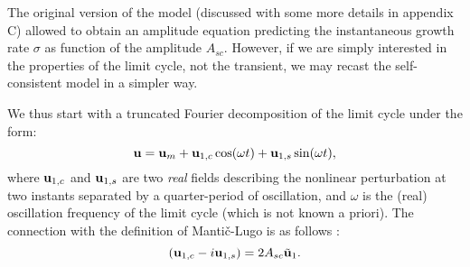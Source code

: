 \documentclass[twocolumn,10pt]{asme2ej}
\newcommand{\be}[1]{ \begin{equation} \label{#1}}
\newcommand{\ee}{\end{equation}}
\begin{document}
The original version of the model (discussed with some more details in appendix C) allowed to obtain an amplitude equation predicting the instantaneous growth rate $\sigma$ as function of the amplitude $A_{sc}$. However, if we are simply interested in the properties of the limit cycle, not the transient, we may recast the self-consistent model in a simpler way. 







We thus start with a truncated Fourier decomposition of the limit cycle under the form:
\be{HB}
{\bf u } = {\bf u }_m + {\bf u }_{1,c} \cos( \omega t ) +   {\bf u }_{1,s} \sin( \omega t ),
\ee
where ${\bf u }_{1,c}$ and ${\bf u }_{1,s}$ are two {\em real} fields describing the nonlinear perturbation at two instants separated by a quarter-period of oscillation, and $\omega$ is the (real) oscillation frequency of the limit cycle (which is not known a priori).  
The connection with the definition of Manti\v{c}-Lugo is as follows :
\be{HBtoSC}
\left( {\bf u }_{1,c} - i {\bf u }_{1,s} \right) = 2 A_{sc} \tilde{{\bf u }}_1.
\ee 
\end{document}
